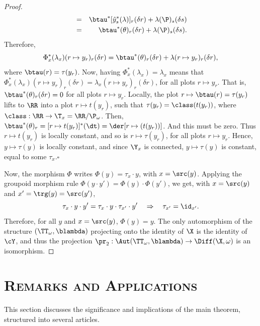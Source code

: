 \begin{proof}
\begin{eqnarray*}
      & = & \btau^*[{\hat y}_s^*(\lambda)]_r(\delta r) + \lambda(\P)_s(\delta s) \\
      & = & \btau^*(\theta)_r(\delta r) + \lambda(\P)_s(\delta s).
    \end{eqnarray*}
    Therefore,
    $$
      \Phi_x^*(\lambda_x)(r \mapsto y_r)_r(\delta r) = \btau^*(\theta)_r(\delta r) + \lambda(r \mapsto y_r)_r(\delta r),
      $$
    where $\btau(r) = \tau(y_r)$.
    Now,
    having $\Phi_x^*(\lambda_x) = \lambda_x$ means that $\Phi_x^*(\lambda_x)(r \mapsto y_r)_r(\delta r) = \lambda_x(r \mapsto y_r)_r(\delta r)$,
    for all plots $r \mapsto y_r$.
    That is,
    $\btau^*(\theta)_r(\delta r) = 0$ for all plots $r \mapsto y_r$.
    Locally,
    the plot $r \mapsto \btau(r) = \tau(y_r)$ lifts to $\RR$ into a plot $r \mapsto t(y_r)$,
    such that $\tau(y_r) = \class(t(y_r))$,
    where $\class : \RR \to \T_x = \RR/\P_\omega$.
    Then,
    $\btau^*(\theta)_r = [r \mapsto t(y_r)]^*(\dt) = \der[r \mapsto(t(y_r))]$.
    And this must be zero.
    Thus $r \mapsto t(y_r)$ is locally constant,
    and so is $r \mapsto \tau(y_r)$,
    for all plots $r \mapsto y_r$.
    Hence,
    $y \mapsto \tau(y)$ is locally constant,
    and since $\Y_x$ is connected,
    $y \mapsto \tau(y)$ is constant,
    equal to some $\tau_x$.\hfill $\square$
    
    Now,
    the morphism $\Phi$ writes $\Phi(y) = \tau_x \cdot y$,
    with $x = \src(y)$.
    Applying the groupoid morphism rule $\Phi(y \cdot y') = \Phi(y) \cdot \Phi(y')$,
    we get,
    with $x = \src(y)$ and $x' = \trg(y) = \src(y')$,
    $$
      \tau_x \cdot y \cdot y' = \tau_x \cdot y \cdot \tau_{x'} \cdot y' \quad \Rightarrow \quad \tau_{x'} = \id_{x'}.
      $$
    Therefore,
    for all $y$ and $x = \src(y)$,
    $\Phi(y) = y$.
    The only automorphism of the structure $(\TT_\omega,\blambda)$ projecting onto the identity of $\X$ is the identity of $\cY$,
    and thus the projection $\pr_2: \Aut(\TT_\omega,\blambda) \to \Diff(\X,\omega)$ is an isomorphism.
  \end{proof}
  
  
  
  \section{\textsc{\textbf{Remarks and Applications}}}
  \label{sec:Remarks and Applications}
  This section discusses the significance and implications of the main theorem,
  structured into several articles.
  
